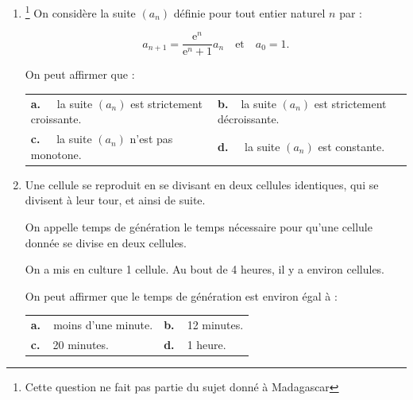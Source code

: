 \begin{enumerate}
\item \footnote{Cette question ne fait pas partie du sujet donné à Madagascar} On considère la suite $\left(a_n\right)$ définie pour tout entier naturel $n$ par :

\[a_{n+1} = \dfrac{\text{e}^n}{\text{e}^n + 1}a_n\quad \text{et} \quad a_0 = 1.\]

On peut affirmer que :

\begin{center}
\begin{tabularx}{\linewidth}{*{2}{X}}
\textbf{a.~~} la suite $\left(a_n\right)$ est strictement croissante.&\textbf{b.~~}la suite $\left(a_n\right)$ est strictement décroissante.\\
\textbf{c.~~} la suite $\left(a_n\right)$ n'est pas monotone.&\textbf{d.~~} la suite $\left(a_n\right)$ est constante.
\end{tabularx}
\end{center}
\item Une cellule se reproduit en se divisant en deux cellules identiques, qui se divisent à leur tour, et ainsi de suite. 

On appelle temps de génération le temps nécessaire pour qu'une cellule donnée se divise en deux cellules.

On a mis en culture 1 cellule. Au bout de 4 heures, il y a environ  cellules.

On peut affirmer que le temps de génération est environ égal à :

\begin{center}
\begin{tabularx}{\linewidth}{*{2}{X}}
\textbf{a.~~}moins d'une minute.&\textbf{b.~~}12 minutes.\\
\textbf{c.~~}20 minutes.		&\textbf{d.~~}1 heure.
\end{tabularx}
\end{center}

\end{enumerate}

\bigskip
